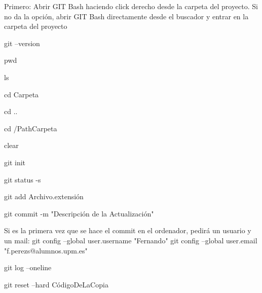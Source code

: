 
Primero: Abrir GIT Bash haciendo click derecho desde la carpeta del proyecto. Si no da la opción, abrir GIT Bash directamente desde el buscador y entrar en la carpeta del proyecto

	git --version		%

	pwd					%

	ls					%

	cd Carpeta			%

	cd ..				%

	cd /PathCarpeta		%

	clear				%



	git init		%

	git status -s	%

	git add Archivo.extensión	%

	git commit -m "Descripción de la Actualización"		%
	
	Si es la primera vez que se hace el commit en el ordenador, pedirá un usuario y un mail:
	git config --global user.username "Fernando"
	git config --global user.email "f.perezs@alumnos.upm.es"

	git log --oneline	%

	git reset --hard CódigoDeLaCopia	%








